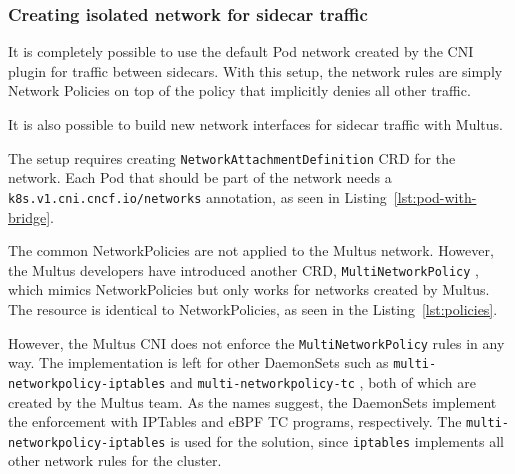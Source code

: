 \documentclass[english, 12pt, a4paper, sci, utf8, a-2b, online]{aaltothesis}
\begin{document}
\subsubsection{Creating isolated network for sidecar traffic}



It is completely possible to use the default Pod network created by the CNI plugin for traffic between sidecars.
With this setup, the network rules are simply Network Policies on top of the policy that implicitly denies all other traffic.

It is also possible to build new network interfaces for sidecar traffic with Multus.



The setup requires creating \texttt{NetworkAttachmentDefinition} CRD for the network.
Each Pod that should be part of the network needs a \texttt{k8s.v1.cni.cncf.io/networks} annotation, as seen in Listing~\ref{lst:pod-with-bridge}.



The common NetworkPolicies are not applied to the Multus network.
However, the Multus developers have introduced another CRD, \texttt{MultiNetworkPolicy} \cite{multi-network-policy}, which mimics NetworkPolicies but only works for networks created by Multus.
The resource is identical to NetworkPolicies, as seen in the Listing~\ref{lst:policies}.



However, the Multus CNI does not enforce the \texttt{MultiNetworkPolicy} rules in any way.
The implementation is left for other DaemonSets such as \texttt{multi-networkpolicy-iptables} \cite{multi-network-policy-iptables} and \texttt{multi-networkpolicy-tc} \cite{multi-network-policy-tc}, both of which are created by the Multus team.
As the names suggest, the DaemonSets implement the enforcement with IPTables and eBPF TC programs, respectively.
The \texttt{multi-networkpolicy-iptables} is used for the solution, since \texttt{iptables} implements all other network rules for the cluster.
\end{document}

